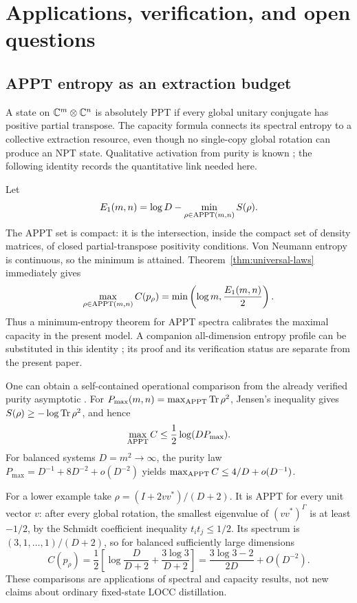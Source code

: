 \section{Applications, verification, and open questions}\label{sec:applications}

\subsection{APPT entropy as an extraction budget}
A state on $\mathbb C^m\otimes\mathbb C^n$ is absolutely PPT if every global unitary conjugate has positive partial transpose. The capacity formula connects its spectral entropy to a collective extraction resource, even though no single-copy global rotation can produce an NPT state. Qualitative activation from purity is known \cite{kondra}; the following identity records the quantitative link needed here.

Let
\[
 E_1(m,n)=\log D-\min_{\rho\in\mathrm{APPT}(m,n)}S(\rho).
\]
The APPT set is compact: it is the intersection, inside the compact set of density matrices, of closed partial-transpose positivity conditions. Von Neumann entropy is continuous, so the minimum is attained. Theorem~\ref{thm:universal-laws} immediately gives
\begin{equation}\label{eq:appt-capacity}
 \max_{\rho\in\mathrm{APPT}(m,n)}C(p_\rho)
 =\min\left(\log m,\frac{E_1(m,n)}2\right).
\end{equation}
Thus a minimum-entropy theorem for APPT spectra calibrates the maximal capacity in the present model. A companion all-dimension entropy profile can be substituted in this identity \cite{zhang-appt-entropy}; its proof and its verification status are separate from the present paper.

One can obtain a self-contained operational comparison from the already verified purity asymptotic \cite{zhang-appt-purity}. For $P_{\max}(m,n)=\max_{\mathrm{APPT}}\operatorname{Tr}\rho^2$, Jensen's inequality gives $S(\rho)\ge-\log\operatorname{Tr}\rho^2$, and hence
\begin{equation}\label{eq:appt-purity-upper}
 \max_{\mathrm{APPT}}C\le\frac12\log(DP_{\max}).
\end{equation}
For balanced systems $D=m^2\to\infty$, the purity law $P_{\max}=D^{-1}+8D^{-2}+o(D^{-2})$ yields $\max_{\mathrm{APPT}}C\le4/D+o(D^{-1})$.

For a lower example take $\rho=(I+2vv^*)/(D+2)$. It is APPT for every unit vector $v$: after every global rotation, the smallest eigenvalue of $(vv^*)^\Gamma$ is at least $-1/2$, by the Schmidt coefficient inequality $t_it_j\le1/2$. Its spectrum is $(3,1,\ldots,1)/(D+2)$, so for balanced sufficiently large dimensions
\[
 C(p_\rho)=\frac12\left[\log\frac D{D+2}+\frac{3\log3}{D+2}\right]
 =\frac{3\log3-2}{2D}+O(D^{-2}).
\]
These comparisons are applications of spectral and capacity results, not new claims about ordinary fixed-state LOCC distillation.

